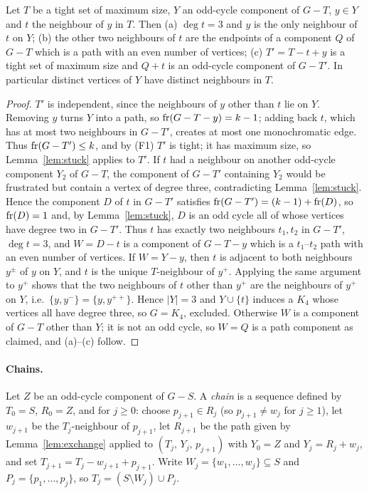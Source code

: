 \begin{lemma}[exchange]\label{lem:exchange}
Let $T$ be a tight set of maximum size, $Y$ an odd-cycle component of $G-T$, $y\in Y$ and $t$ the
neighbour of $y$ in $T$. Then
(a) $\deg t=3$ and $y$ is the only neighbour of $t$ on $Y$;
(b) the other two neighbours of $t$ are the endpoints of a component $Q$ of $G-T$ which is a path
with an even number of vertices;
(c) $T'=T-t+y$ is a tight set of maximum size and $Q+t$ is an odd-cycle component of $G-T'$.
In particular distinct vertices of $Y$ have distinct neighbours in $T$.
\end{lemma}
\begin{proof}
$T'$ is independent, since the neighbours of $y$ other than $t$ lie on $Y$. Removing $y$ turns $Y$
into a path, so $\operatorname{fr}(G-T-y)=k-1$; adding back $t$, which has at most two neighbours in
$G-T'$, creates at most one monochromatic edge. Thus $\operatorname{fr}(G-T')\le k$, and by (F1) $T'$ is tight;
it has maximum size, so Lemma~\ref{lem:stuck} applies to $T'$.
If $t$ had a neighbour on another odd-cycle component $Y_2$ of $G-T$, the component of $G-T'$
containing $Y_2$ would be frustrated but contain a vertex of degree three, contradicting
Lemma~\ref{lem:stuck}. Hence the component $D$ of $t$ in $G-T'$ satisfies
$\operatorname{fr}(G-T')=(k-1)+\operatorname{fr}(D)$, so $\operatorname{fr}(D)=1$ and, by Lemma~\ref{lem:stuck}, $D$ is an odd cycle all of
whose vertices have degree two in $G-T'$. Thus $t$ has exactly two neighbours $t_1,t_2$ in
$G-T'$, $\deg t=3$, and $W=D-t$ is a component of $G-T-y$ which is a $t_1$--$t_2$ path with an
even number of vertices.
If $W=Y-y$, then $t$ is adjacent to both neighbours $y^\pm$ of $y$ on $Y$, and $t$ is the unique
$T$-neighbour of $y^+$. Applying the same argument to $y^+$ shows that the two neighbours of $t$
other than $y^+$ are the neighbours of $y^+$ on $Y$, i.e.\ $\{y,y^-\}=\{y,y^{++}\}$. Hence $|Y|=3$
and $Y\cup\{t\}$ induces a $K_4$ whose vertices all have degree three, so $G=K_4$, excluded.
Otherwise $W$ is a component of $G-T$ other than $Y$; it is not an odd cycle, so $W=Q$ is a
path component as claimed, and (a)--(c) follow.
\end{proof}

\paragraph*{Chains.}
Let $Z$ be an odd-cycle component of $G-S$. A \emph{chain} is a sequence defined by
$T_0=S$, $R_0=Z$, and for $j\ge0$: choose $p_{j+1}\in R_j$ (so $p_{j+1}\ne w_j$ for $j\ge1$), let $w_{j+1}$ be the
$T_j$-neighbour of $p_{j+1}$, let $R_{j+1}$ be the path given by Lemma~\ref{lem:exchange} applied
to $(T_j,\,Y_j,\,p_{j+1})$ with $Y_0=Z$ and $Y_j=R_j+w_j$, and set $T_{j+1}=T_j-w_{j+1}+p_{j+1}$.
Write $W_j=\{w_1,\dots,w_j\}\subseteq S$ and $P_j=\{p_1,\dots,p_j\}$, so $T_j=(S\setminus W_j)\cup P_j$.

